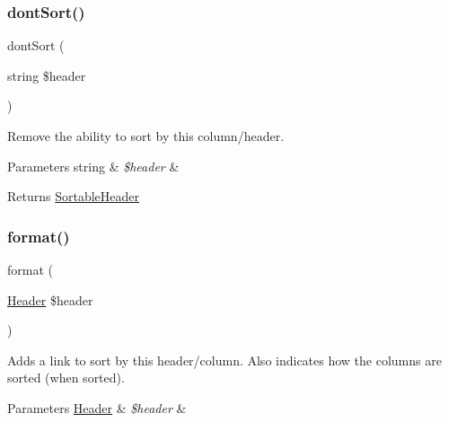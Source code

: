 \subsubsection{\texorpdfstring{dont\+Sort()}{dontSort()}}
{\footnotesize\ttfamily dont\+Sort (\begin{DoxyParamCaption}\item[{string}]{\$header }\end{DoxyParamCaption})}

Remove the ability to sort by this column/header.


\begin{DoxyParams}[1]{Parameters}
string & {\em \$header} & \\
\hline
\end{DoxyParams}
\begin{DoxyReturn}{Returns}
\hyperlink{classhamburgscleanest_1_1_data_tables_1_1_models_1_1_header_formatters_1_1_sortable_header}{Sortable\+Header} 
\end{DoxyReturn}
\mbox{\label{classhamburgscleanest_1_1_data_tables_1_1_models_1_1_header_formatters_1_1_sortable_header_aa5aeddf9c056d9583b29322f75f70f82}} 
\subsubsection{\texorpdfstring{format()}{format()}}
{\footnotesize\ttfamily format (\begin{DoxyParamCaption}\item[{\hyperlink{classhamburgscleanest_1_1_data_tables_1_1_models_1_1_header}{Header}}]{\$header }\end{DoxyParamCaption})}

Adds a link to sort by this header/column. Also indicates how the columns are sorted (when sorted).


\begin{DoxyParams}[1]{Parameters}
\hyperlink{classhamburgscleanest_1_1_data_tables_1_1_models_1_1_header}{Header} & {\em \$header} & \\
\hline
\end{DoxyParams}

